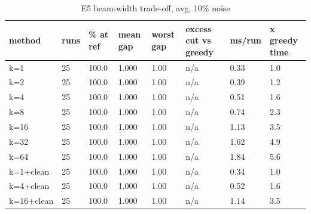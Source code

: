 \begin{table}[t]\centering\small
\caption{E5 beam-width trade-off, avg, 10\% noise}
\begin{tabular}{llllllll}
\toprule
method & runs & \% at ref & mean gap & worst gap & excess cut vs greedy & ms/run & x greedy time \\
\midrule
k=1 & 25 & 100.0 & 1.000 & 1.00 & n/a & 0.33 & 1.0 \\
k=2 & 25 & 100.0 & 1.000 & 1.00 & n/a & 0.39 & 1.2 \\
k=4 & 25 & 100.0 & 1.000 & 1.00 & n/a & 0.51 & 1.6 \\
k=8 & 25 & 100.0 & 1.000 & 1.00 & n/a & 0.74 & 2.3 \\
k=16 & 25 & 100.0 & 1.000 & 1.00 & n/a & 1.13 & 3.5 \\
k=32 & 25 & 100.0 & 1.000 & 1.00 & n/a & 1.62 & 4.9 \\
k=64 & 25 & 100.0 & 1.000 & 1.00 & n/a & 1.84 & 5.6 \\
k=1+clean & 25 & 100.0 & 1.000 & 1.00 & n/a & 0.34 & 1.0 \\
k=4+clean & 25 & 100.0 & 1.000 & 1.00 & n/a & 0.52 & 1.6 \\
k=16+clean & 25 & 100.0 & 1.000 & 1.00 & n/a & 1.14 & 3.5 \\
\bottomrule
\end{tabular}\end{table}

